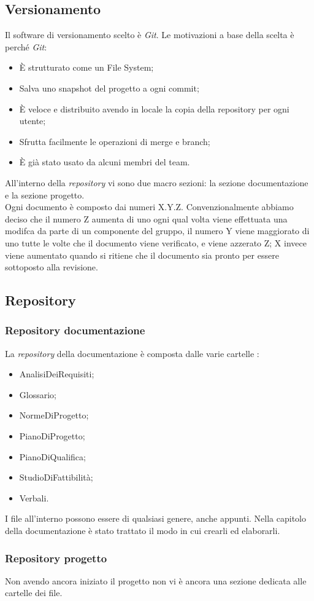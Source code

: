 \documentclass[12pt,a4paper,titlepage]{article}
\begin{document}
\subsection{Versionamento}
Il software di versionamento scelto è \textit{Git}. Le motivazioni a base della scelta è perché \textit{Git}:
\begin{itemize}
	\item È strutturato come un File System;
	\item Salva uno snapshot del progetto a ogni commit;
	\item È veloce e distribuito avendo in locale la copia della repository per ogni utente;
	\item Sfrutta facilmente le operazioni di merge e branch;
	\item È già stato usato da alcuni membri del team.
\end{itemize}
All'interno della \textit{repository} vi sono due macro sezioni: la sezione documentazione e la sezione progetto.\\
Ogni documento è composto dai numeri X.Y.Z. Convenzionalmente abbiamo deciso che il numero Z aumenta di uno ogni qual volta viene effettuata una modifca da parte di un componente del gruppo, il numero Y viene maggiorato di uno tutte le volte che il documento viene verificato, e viene azzerato Z; X invece viene aumentato quando si ritiene che il documento sia pronto per essere sottoposto alla revisione.
\newpage
\subsection{Repository}
\subsubsection{Repository documentazione}
La \textit{repository} della documentazione è composta dalle varie cartelle :
\begin{itemize}
	\item AnalisiDeiRequisiti;
	\item Glossario;
	\item NormeDiProgetto;
	\item PianoDiProgetto;
	\item PianoDiQualifica;
	\item StudioDiFattibilità;
	\item Verbali.
\end{itemize}
I file all'interno possono essere di qualsiasi genere, anche appunti. Nella capitolo della documentazione è stato trattato il modo in cui crearli ed elaborarli.
\subsubsection{Repository progetto}
Non avendo ancora iniziato il progetto non vi è ancora una sezione dedicata alle cartelle dei file.\\
\end{document}

